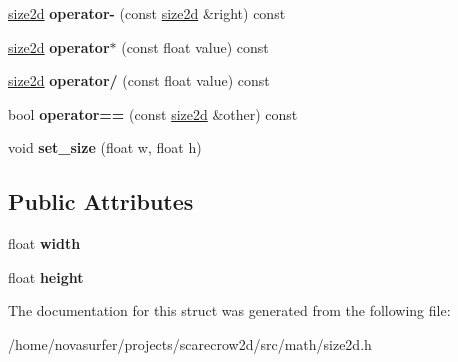 \begin{DoxyCompactItemize}
\hyperlink{structmath_1_1size2d}{size2d} {\bfseries operator-\/} (const \hyperlink{structmath_1_1size2d}{size2d} \&right) const
\item 
\mbox{\label{structmath_1_1size2d_acd697b9b78e2edf6e3131dd7c2e0d016}} 
\hyperlink{structmath_1_1size2d}{size2d} {\bfseries operator$\ast$} (const float value) const
\item 
\mbox{\label{structmath_1_1size2d_ae6199c29b41042fe992be6f8b160e332}} 
\hyperlink{structmath_1_1size2d}{size2d} {\bfseries operator/} (const float value) const
\item 
\mbox{\label{structmath_1_1size2d_a8d8e2b6c6a58856e2007dc0cc2b4d158}} 
bool {\bfseries operator==} (const \hyperlink{structmath_1_1size2d}{size2d} \&other) const
\item 
\mbox{\label{structmath_1_1size2d_ae5f8c8ddf8ccf35a27bf245af88802ce}} 
void {\bfseries set\+\_\+size} (float w, float h)
\end{DoxyCompactItemize}
\subsection*{Public Attributes}
\begin{DoxyCompactItemize}
\item 
\mbox{\label{structmath_1_1size2d_a65ea5646d7d17842ee951eefa70d798d}} 
float {\bfseries width}
\item 
\mbox{\label{structmath_1_1size2d_a718eb82ed740406ff06576231cb5e7d2}} 
float {\bfseries height}
\end{DoxyCompactItemize}


The documentation for this struct was generated from the following file\+:\begin{DoxyCompactItemize}
\item 
/home/novasurfer/projects/scarecrow2d/src/math/size2d.\+h\end{DoxyCompactItemize}
